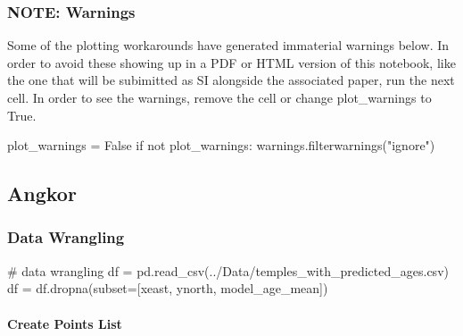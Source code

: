 \documentclass[
  11pt,
  letterpaper,
  DIV=11,
  numbers=noendperiod]{scrartcl}
\let\oldparagraph\paragraph
\renewcommand{\paragraph}[1]{\oldparagraph{#1}\mbox{}}
\newenvironment{Shaded}{\begin{snugshade}}{\end{snugshade}}
\newcommand{\CommentTok}[1]{\textcolor[rgb]{0.37,0.37,0.37}{#1}}
\newcommand{\ControlFlowTok}[1]{\textcolor[rgb]{0.00,0.23,0.31}{#1}}
\newcommand{\KeywordTok}[1]{\textcolor[rgb]{0.00,0.23,0.31}{#1}}
\newcommand{\NormalTok}[1]{\textcolor[rgb]{0.00,0.23,0.31}{#1}}
\newcommand{\OperatorTok}[1]{\textcolor[rgb]{0.37,0.37,0.37}{#1}}
\newcommand{\StringTok}[1]{\textcolor[rgb]{0.13,0.47,0.30}{#1}}
\newcommand{\VariableTok}[1]{\textcolor[rgb]{0.07,0.07,0.07}{#1}}
\begin{document}
\subsubsection{NOTE: Warnings}\label{note-warnings}

Some of the plotting workarounds have generated immaterial warnings
below. In order to avoid these showing up in a PDF or HTML version of
this notebook, like the one that will be subimitted as SI alongside the
associated paper, run the next cell. In order to see the warnings,
remove the cell or change plot\_warnings to True.

\begin{Shaded}
\begin{Highlighting}[]
\NormalTok{plot\_warnings }\OperatorTok{=} \VariableTok{False}
\ControlFlowTok{if} \KeywordTok{not}\NormalTok{ plot\_warnings:}
\NormalTok{    warnings.filterwarnings(}\StringTok{"ignore"}\NormalTok{)}
\end{Highlighting}
\end{Shaded}

\subsection{Angkor}\label{angkor}

\subsubsection{Data Wrangling}\label{data-wrangling}

\begin{Shaded}
\begin{Highlighting}[]
\CommentTok{\# data wrangling}
\NormalTok{df }\OperatorTok{=}\NormalTok{ pd.read\_csv(}\StringTok{\textquotesingle{}../Data/temples\_with\_predicted\_ages.csv\textquotesingle{}}\NormalTok{)}
\NormalTok{df }\OperatorTok{=}\NormalTok{ df.dropna(subset}\OperatorTok{=}\NormalTok{[}\StringTok{\textquotesingle{}xeast\textquotesingle{}}\NormalTok{, }\StringTok{\textquotesingle{}ynorth\textquotesingle{}}\NormalTok{, }\StringTok{\textquotesingle{}model\_age\_mean\textquotesingle{}}\NormalTok{])}
\end{Highlighting}
\end{Shaded}

\paragraph{Create Points List}\label{create-points-list}
\end{document}
